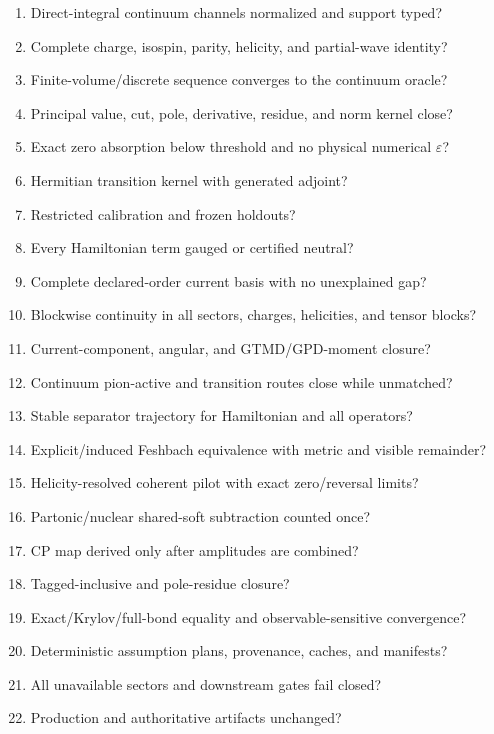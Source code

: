 \documentclass[11pt]{article}
\newcommand{\eps}{\varepsilon}
\begin{document}
\begin{enumerate}
\item Direct-integral continuum channels normalized and support typed?
\item Complete charge, isospin, parity, helicity, and partial-wave identity?
\item Finite-volume/discrete sequence converges to the continuum oracle?
\item Principal value, cut, pole, derivative, residue, and norm kernel close?
\item Exact zero absorption below threshold and no physical numerical \(\eps\)?
\item Hermitian transition kernel with generated adjoint?
\item Restricted calibration and frozen holdouts?
\item Every Hamiltonian term gauged or certified neutral?
\item Complete declared-order current basis with no unexplained gap?
\item Blockwise continuity in all sectors, charges, helicities, and tensor blocks?
\item Current-component, angular, and GTMD/GPD-moment closure?
\item Continuum pion-active and transition routes close while unmatched?
\item Stable separator trajectory for Hamiltonian and all operators?
\item Explicit/induced Feshbach equivalence with metric and visible remainder?
\item Helicity-resolved coherent pilot with exact zero/reversal limits?
\item Partonic/nuclear shared-soft subtraction counted once?
\item CP map derived only after amplitudes are combined?
\item Tagged-inclusive and pole-residue closure?
\item Exact/Krylov/full-bond equality and observable-sensitive convergence?
\item Deterministic assumption plans, provenance, caches, and manifests?
\item All unavailable sectors and downstream gates fail closed?
\item Production and authoritative artifacts unchanged?
\end{enumerate}
\end{document}

